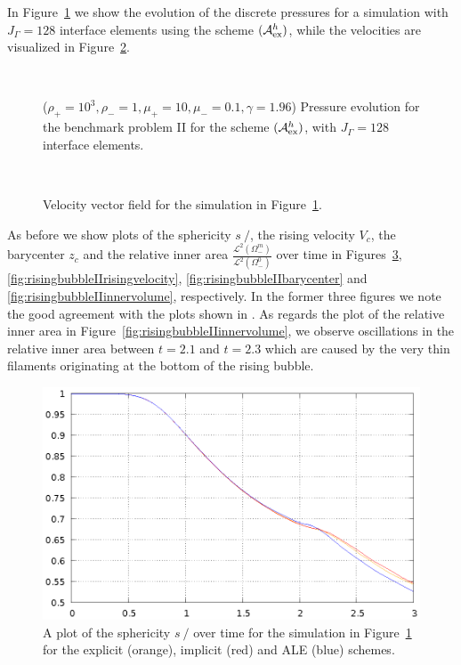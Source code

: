 \documentclass[a4paper,12pt,onecolumn]{article}
\newcommand{\strikes}{\mbox{$s\!\!\!\!\:/$}}
\newcommand{\schemeAex}{{\mathcal{A}^h_{\rm ex}}}
\begin{document}
In Figure~\ref{fig:risingbubbleIIpressure} we show the evolution of the discrete
pressures for a simulation with $J_\Gamma=128$ interface elements using the
scheme $(\schemeAex)$, while the velocities are visualized in
Figure~\ref{fig:risingbubbleIIvelocity}.
\begin{figure}[htbp]
\centering
{}
\\
\caption{($\rho_+ = 10^3,\rho_- = 1,\mu_+ = 10,\mu_- =0.1,\gamma = 1.96$)
Pressure evolution for the benchmark problem II for the scheme $(\schemeAex)$,
with $J_\Gamma=128$ interface elements.}
\label{fig:risingbubbleIIpressure}
\end{figure}%
\begin{figure}[htbp]
\centering
{}
\\
\caption{Velocity vector field for the simulation in
Figure~\ref{fig:risingbubbleIIpressure}.}
\label{fig:risingbubbleIIvelocity}
\end{figure}%
As before we show plots of the sphericity $\strikes$, the
rising velocity $V_c$, the barycenter $z_c$ and the relative
inner area $\frac{\mathcal{L}^2(\Omega^m_-)}{\mathcal{L}^2(\Omega^0_-)}$ over
time in Figures~\ref{fig:risingbubbleIIsphericity},
\ref{fig:risingbubbleIIrisingvelocity}, \ref{fig:risingbubbleIIbarycenter} and
\ref{fig:risingbubbleIIinnervolume}, respectively. In the former three
figures we note the good agreement with the plots shown in
\cite{HysingTKPBGT09}. As regards the plot of the relative inner area
in Figure~\ref{fig:risingbubbleIIinnervolume}, we observe oscillations in
the relative inner area between $t=2.1$ and $t=2.3$ which are caused by
the very thin filaments originating at the bottom of the rising bubble.
\begin{figure}[htbp]
\centering
\includegraphics[width=.45\textwidth]
{figures/rising_bubble_II_sphericity.ps}
\caption{A plot of the sphericity $\strikes$ over time for the simulation in
Figure~\ref{fig:risingbubbleIIpressure} for the explicit (orange), implicit
(red) and ALE (blue) schemes.}
\label{fig:risingbubbleIIsphericity}
\end{figure}%
\end{document}
